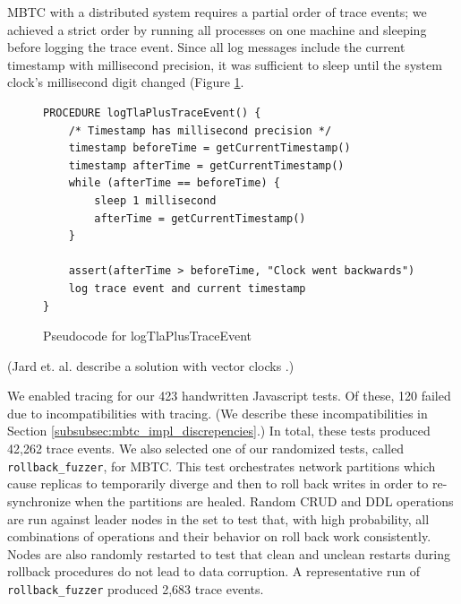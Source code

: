 \documentclass{vldb}
\begin{document}
MBTC with a distributed system requires a partial order of trace events; we achieved a strict order by running all processes on one machine and sleeping before logging the trace event.
Since all log messages include the current timestamp with millisecond precision, it was sufficient to sleep until the system clock's millisecond digit changed (Figure \ref{fig:millisecond_sleep}.

\begin{figure}
\begin{verbatim}
PROCEDURE logTlaPlusTraceEvent() {
    /* Timestamp has millisecond precision */
    timestamp beforeTime = getCurrentTimestamp()
    timestamp afterTime = getCurrentTimestamp()
    while (afterTime == beforeTime) {
        sleep 1 millisecond
        afterTime = getCurrentTimestamp()
    }

    assert(afterTime > beforeTime, "Clock went backwards")
    log trace event and current timestamp
}
\end{verbatim}
\caption{Pseudocode for logTlaPlusTraceEvent}
\label{fig:millisecond_sleep}
\end{figure}

(Jard et. al. describe a solution with vector clocks \cite{Jard94GeneralApproachToTraceChecking}.)


We enabled tracing for our 423 handwritten Javascript tests. 
Of these, 120 failed due to incompatibilities with tracing. 
(We describe these incompatibilities in Section \ref{subsubsec:mbtc_impl_discrepencies}.)
In total, these tests produced 42,262 trace events. 
We also selected one of our randomized tests, called \texttt{rollback\_fuzzer}, for MBTC. 
This test orchestrates network partitions which cause replicas to temporarily diverge and then to roll back writes in order to re-synchronize when the partitions are healed.
Random CRUD and DDL operations are run against leader nodes in the set to test that, with high probability, all combinations of operations and their behavior on roll back work consistently.
Nodes are also randomly restarted to test that clean and unclean restarts during rollback procedures do not lead to data corruption.
A representative run of \texttt{rollback\_fuzzer} produced 2,683 trace events.
\end{document}
